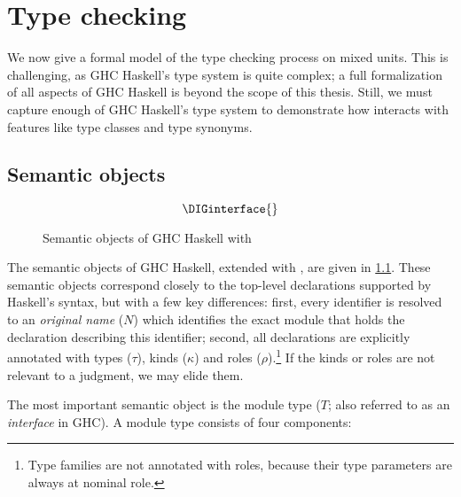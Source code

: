 \chapter{Type checking}
\label{sec:compiler}

We now give a formal model of the type checking process on mixed
units.  This is challenging, as GHC Haskell's type system is quite
complex; a full formalization of all aspects of GHC Haskell is
beyond the scope of this thesis.  Still, we must capture enough
of GHC Haskell's type system to demonstrate how \Backpack{}
interacts with features like type classes and type synonyms.


\section{Semantic objects}
\label{sec:semantic-objects}

\begin{figure}
\[ \DIGinterface{} \]
\caption{Semantic objects of GHC Haskell with \Backpack{}}
\label{fig:semantic-objects}
\end{figure}

The semantic objects of GHC Haskell, extended with \Backpack{}, are
given in \cref{fig:semantic-objects}.  These semantic objects
correspond closely to the top-level declarations supported by
Haskell's syntax, but with a few key differences: first, every
identifier is resolved to an \emph{original name} ($N$) which identifies
the exact module that holds the declaration describing this identifier;
second, all declarations are explicitly annotated with types ($\tau$), kinds ($\kappa$) and
roles ($\rho$).\footnote{Type families are not annotated with roles, because their
type parameters are always at nominal role.}  If the kinds or roles are not
relevant to a judgment, we may elide them.

The most important semantic object is the module type ($T$; also referred
to as an \emph{interface} in GHC).  A module
type consists of four components:

